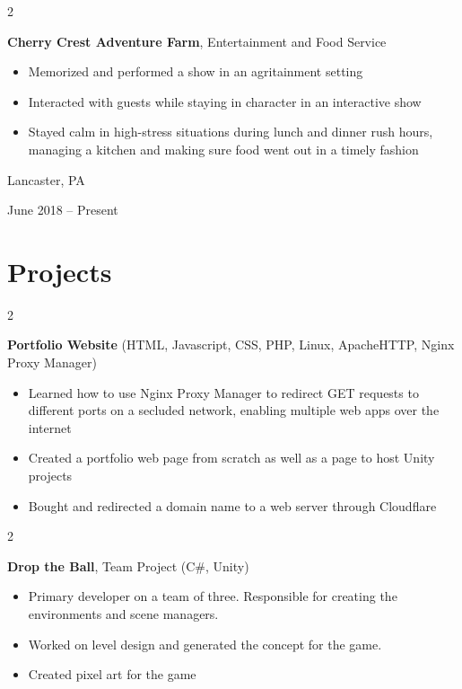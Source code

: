\documentclass[10pt, letterpaper]{article}
\newenvironment{highlights}{
    \begin{itemize}[
        topsep=0.10 cm,
        parsep=0.10 cm,
        partopsep=0pt,
        itemsep=0pt,
        leftmargin=0.4 cm + 10pt
    ]
}{
    \end{itemize}
} %
\newenvironment{twocolentry}[2][]{
    \onecolentry
    \def\secondColumn{#2}
    \setcolumnwidth{\fill, 3.4 cm}
    \begin{paracol}{2}
}{
    \switchcolumn \raggedleft \secondColumn
    \end{paracol}
    \endonecolentry
} %
\begin{document}
        \begin{twocolentry}{
            Lancaster, PA

        June 2018 – Present
        }
            \textbf{Cherry Crest Adventure Farm}, Entertainment and Food Service
            \begin{highlights}
                \item Memorized and performed a show in an agritainment setting
                \item Interacted with guests while staying in character in an interactive show
                \item Stayed calm in high-stress situations during lunch and dinner rush hours, managing a kitchen and making sure food went out in a timely fashion
            \end{highlights}
        \end{twocolentry}


    
    \section{Projects}

        \begin{twocolentry}{
            2025
        }
            \textbf{Portfolio Website} (HTML, Javascript, CSS, PHP, Linux, ApacheHTTP, Nginx Proxy Manager)
            \begin{highlights}
                \item Learned how to use Nginx Proxy Manager to redirect GET requests to different ports on a secluded network, enabling multiple web apps over the internet
                \item Created a portfolio web page from scratch as well as a page to host Unity 
                projects
                \item Bought and redirected a domain name to a web server through Cloudflare
            \end{highlights}
        \end{twocolentry}

        \begin{twocolentry}{
            2025
        }
            \textbf{Drop the Ball}, Team Project (C\#, Unity)
            \begin{highlights}
                \item Primary developer on a team of three. Responsible for creating the environments and scene managers. 
                \item Worked on level design and generated the concept for the game.
                \item Created pixel art for the game
            \end{highlights}
        \end{twocolentry}
        
\end{document}

